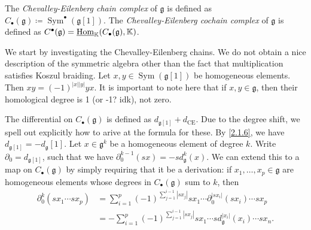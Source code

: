 \begin{definition}\label{3.2.1}
	The \emph{Chevalley-Eilenberg chain complex} of $\mathfrak{g} $ is defined as $C_{\bullet} (\mathfrak{g} )\coloneqq \operatorname{Sym}^{\bullet} (\mathfrak{g} [1])$. The \emph{Chevalley-Eilenberg cochain complex} of $\mathfrak{g} $ is defined as $C^{\bullet} (\mathfrak{g} )=\underline{\operatorname{Hom}}_\mathbb{K} (C_{\bullet} (\mathfrak{g}), \mathbb{K} ) $.
\end{definition}

\begin{discussion}\label{3.2.2}
	We start by investigating the Chevalley-Eilenberg chains. We do not obtain a nice description of the symmetric algebra other than the fact that multiplication satisfies Koszul braiding. Let $x,y\in \operatorname{Sym} (\mathfrak{g} [1])$ be homogeneous elements. Then $xy=(-1)^{\left| x \right| \left| y \right| } yx$. It is important to note here that if $x,y\in \mathfrak{g} $, then their homological degree is 1 (or -1? idk), not zero.

	The differential on $C_{\bullet} (\mathfrak{g} )$ is defined as $d_{\mathfrak{g} [1]} +d_{\mathrm{CE} } $. Due to the degree shift, we spell out explicitly how to arive at the formula for these. By \cref{2.1.6}, we have $d_{\mathfrak{g} [1]} =-d_\mathfrak{g} [1]$. Let $x\in \mathfrak{g} ^k$ be a homogeneous element of degree $k$. Write $\partial _0 = d_{\mathfrak{g} [1]} $, such that we have $\partial^{k-1}_0(sx)=-sd_\mathfrak{g}^{k}(x)$. We can extend this to a map on $C_{\bullet} (\mathfrak{g} )$ by simply requiring that it be a derivation: if $x_1, \ldots ,x_p\in \mathfrak{g} $ are homogeneous elements whose degrees in $C_{\bullet} (\mathfrak{g} )$ sum to $k$, then
	\begin{align*}
		\partial _0^k(sx_1 \cdots sx_p) &= \sum_{i=1}^{p} (-1)^{\sum_{j=1}^{i-1} \left| sx_j \right| } sx_1 \cdots \partial _0^{\left| sx_i \right| }(sx_i) \cdots sx_p\\
					      &= - \sum_{i=1}^{p} (-1)^{\sum_{j=1}^{i-1} \left| sx_j \right| } sx_1 \cdots sd^{\left| x_i \right|}_\mathfrak{g} (x_i) \cdots sx_n
	.\end{align*}
	

\end{discussion}
